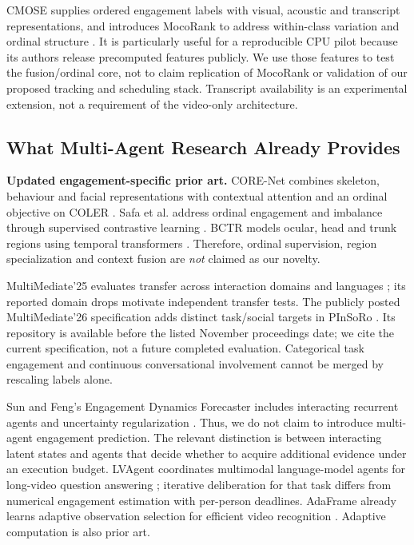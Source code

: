 \documentclass[a4paper,conference]{IEEEtran}
\begin{document}
CMOSE supplies ordered engagement labels with visual, acoustic and transcript representations, and introduces MocoRank to address within-class variation and ordinal structure \cite{cmose}. It is particularly useful for a reproducible CPU pilot because its authors release precomputed features publicly. We use those features to test the fusion/ordinal core, not to claim replication of MocoRank or validation of our proposed tracking and scheduling stack. Transcript availability is an experimental extension, not a requirement of the video-only architecture.

\subsection{What Multi-Agent Research Already Provides}
\textbf{Updated engagement-specific prior art.} CORE-Net combines skeleton, behaviour and facial representations with contextual attention and an ordinal objective on COLER \cite{core}. Safa et al. address ordinal engagement and imbalance through supervised contrastive learning \cite{ordinaleng}. BCTR models ocular, head and trunk regions using temporal transformers \cite{bctr}. Therefore, ordinal supervision, region specialization and context fusion are \emph{not} claimed as our novelty.

MultiMediate'25 evaluates transfer across interaction domains and languages \cite{mm25}; its reported domain drops motivate independent transfer tests. The publicly posted MultiMediate'26 specification adds distinct task/social targets in PInSoRo \cite{mm26}. Its repository is available before the listed November proceedings date; we cite the current specification, not a future completed evaluation. Categorical task engagement and continuous conversational involvement cannot be merged by rescaling labels alone.

Sun and Feng's Engagement Dynamics Forecaster includes interacting recurrent agents and uncertainty regularization \cite{edf}. Thus, we do not claim to introduce multi-agent engagement prediction. The relevant distinction is between interacting latent states and agents that decide whether to acquire additional evidence under an execution budget. LVAgent coordinates multimodal language-model agents for long-video question answering \cite{lvagent}; iterative deliberation for that task differs from numerical engagement estimation with per-person deadlines. AdaFrame already learns adaptive observation selection for efficient video recognition \cite{adaframe}. Adaptive computation is also prior art.
\end{document}
